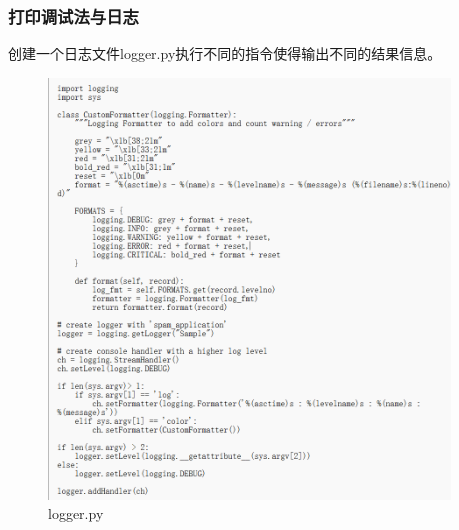 \documentclass[UTF8]{ctexart}
\begin{document}
\subsubsection{打印调试法与日志}
创建一个日志文件logger.py执行不同的指令使得输出不同的结果信息。
\begin{figure}[H]
    \centering
    \includegraphics[width=0.95\textwidth]{picture/日志文件.png}
    \caption{logger.py}
\end{figure}
\end{document}
